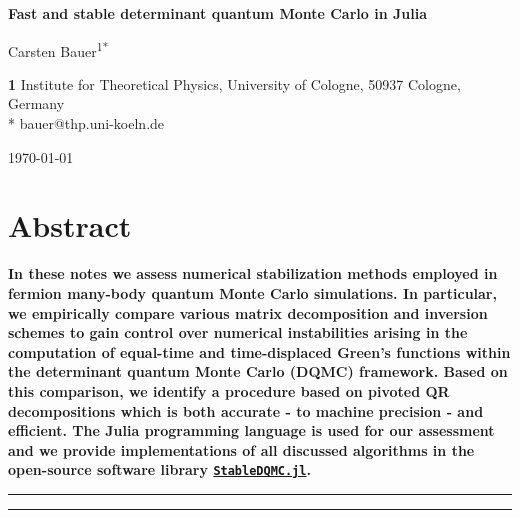 \documentclass[submission, Phys]{SciPost}
\begin{document}
\begin{center}{\Large \textbf{
Fast and stable determinant quantum Monte Carlo in Julia
}}\end{center}

\begin{center}
Carsten Bauer\textsuperscript{1*}
\end{center}

\begin{center}
{\bf 1} Institute for Theoretical Physics, University of Cologne, 50937 Cologne, Germany
\\
* bauer@thp.uni-koeln.de
\end{center}

\begin{center}
\today
\end{center}


\section*{Abstract}
{\bf
In these notes we assess numerical stabilization methods employed in fermion many-body quantum Monte Carlo simulations. In particular, we empirically compare various matrix decomposition and inversion schemes to gain control over numerical instabilities arising in the computation of equal-time and time-displaced Green's functions within the determinant quantum Monte Carlo (DQMC) framework. Based on this comparison, we identify a procedure based on pivoted QR decompositions which is both accurate - to machine precision - and efficient. The Julia programming language is used for our assessment and we provide implementations of all discussed algorithms in the open-source software library \href{http://github.com/crstnbr/StableDQMC.jl}{\texttt{StableDQMC.jl}}.
}


\vspace{10pt}
\noindent\rule{\textwidth}{1pt}
\tableofcontents\thispagestyle{fancy}
\noindent\rule{\textwidth}{1pt}
\vspace{10pt}
\end{document}
